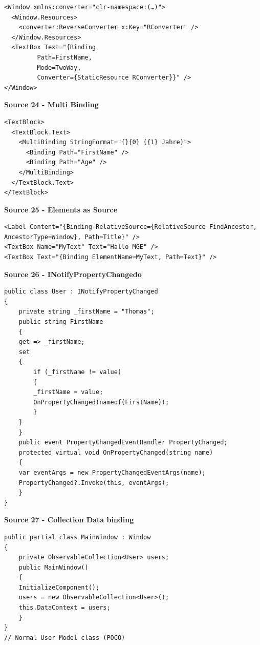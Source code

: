 \documentclass[10pt,twoside,landscape]{article}
\begin{document}
\begin{multicols}{2}
\lstset{language=XML,label= ,caption= ,captionpos=b,numbers=none}
\begin{lstlisting}
<Window xmlns:converter="clr-namespace:(…)">
  <Window.Resources>
    <converter:ReverseConverter x:Key="RConverter" />
  </Window.Resources>
  <TextBox Text="{Binding
		 Path=FirstName,
		 Mode=TwoWay,
		 Converter={StaticResource RConverter}}" />
</Window>
\end{lstlisting}

\textbf{Source 24 - Multi Binding}
\lstset{language=XML,label= ,caption= ,captionpos=b,numbers=none}
\begin{lstlisting}
<TextBlock>
  <TextBlock.Text>
    <MultiBinding StringFormat="{}{0} ({1} Jahre)">
      <Binding Path="FirstName" />
      <Binding Path="Age" />
    </MultiBinding>
  </TextBlock.Text>
</TextBlock>
\end{lstlisting}

\textbf{Source 25 - Elements as Source}
\lstset{language=XML,label= ,caption= ,captionpos=b,numbers=none}
\begin{lstlisting}
<Label Content="{Binding RelativeSource={RelativeSource FindAncestor, AncestorType=Window}, Path=Title}" />
<TextBox Name="MyText" Text="Hallo MGE" />
<TextBox Text="{Binding ElementName=MyText, Path=Text}" />
\end{lstlisting}

\textbf{Source 26 - INotifyPropertyChangedo}
\lstset{language=csharp,label= ,caption= ,captionpos=b,numbers=none}
\begin{lstlisting}
public class User : INotifyPropertyChanged
{
    private string _firstName = "Thomas";
    public string FirstName
    {
	get => _firstName;
	set
	{
	    if (_firstName != value)
	    {
		_firstName = value;
		OnPropertyChanged(nameof(FirstName));
	    }
	}
    }
    public event PropertyChangedEventHandler PropertyChanged;
    protected virtual void OnPropertyChanged(string name)
    {
	var eventArgs = new PropertyChangedEventArgs(name);
	PropertyChanged?.Invoke(this, eventArgs);
    }
}
\end{lstlisting}

\textbf{Source 27 - Collection Data binding}
\lstset{language=csharp,label= ,caption= ,captionpos=b,numbers=none}
\begin{lstlisting}
public partial class MainWindow : Window
{
    private ObservableCollection<User> users;
    public MainWindow()
    {
	InitializeComponent();
	users = new ObservableCollection<User>();
	this.DataContext = users;
    }
}
// Normal User Model class (POCO)
\end{lstlisting}


\end{multicols}
\end{document}
